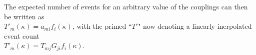     The expected number of events for an arbitrary value of the couplings can then be written as\\
    $T'_m(\kappa) = a_{mi} f_i(\kappa) $, with the primed ``$T'$" now denoting a linearly inerpolated event count\\
    $T'_m(\kappa) = T_{mj} G_{ji} f_i(\kappa) $.








